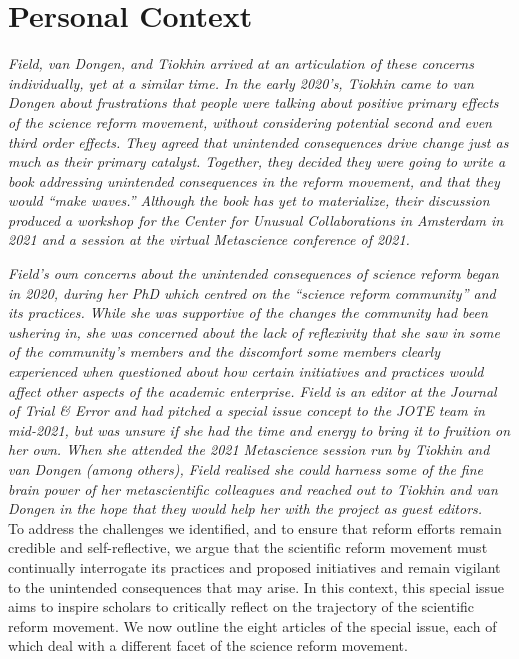 \documentclass[authordate, editorial,noabstract]{jote-new-article}
\begin{document}
\section{Personal Context}



\emph{Field, van Dongen, and Tiokhin arrived at an articulation of these concerns individually, yet at a similar time. In the early 2020's, Tiokhin came to van Dongen about frustrations that people were talking about positive primary effects of the science reform movement, without considering potential second and even third order effects. They agreed that unintended consequences drive change just as much as their primary catalyst. Together, they decided they were going to write a book addressing unintended consequences in the reform movement, and that they would “make waves.” Although the book has yet to materialize, their discussion produced a workshop for the Center for Unusual Collaborations in Amsterdam in 2021 and a session at the virtual Metascience conference of 2021. }



\emph{Field's own concerns about the unintended consequences of science reform began in 2020, during her PhD which centred on the “science reform community” and its practices. While she was supportive of the changes the community had been ushering in, she was concerned about the lack of reflexivity that she saw in some of the community's members and the discomfort some members clearly experienced when questioned about how certain initiatives and practices would affect other aspects of the academic enterprise. Field is an editor at the Journal of Trial \& Error and had pitched a special issue concept to the JOTE team in mid-}\emph{2021, but}\emph{ was unsure if she had the time and energy to bring it to fruition on her own. When she attended the 2021 Metascience session run by Tiokhin and van Dongen (among others), Field realised she could harness some of the fine brain power of her metascientific colleagues and reached out to Tiokhin and van Dongen in the hope that they would help her with the project as guest editors. }\\







To address the challenges we identified, and to ensure that reform efforts remain credible and self-reflective, we argue that the scientific reform movement must continually interrogate its practices and proposed initiatives and remain vigilant to the unintended consequences that may arise. In this context, this special issue aims to inspire scholars to critically reflect on the trajectory of the scientific reform movement. We now outline the eight articles of the special issue, each of which deal with a different facet of the science reform movement.
\end{document}

